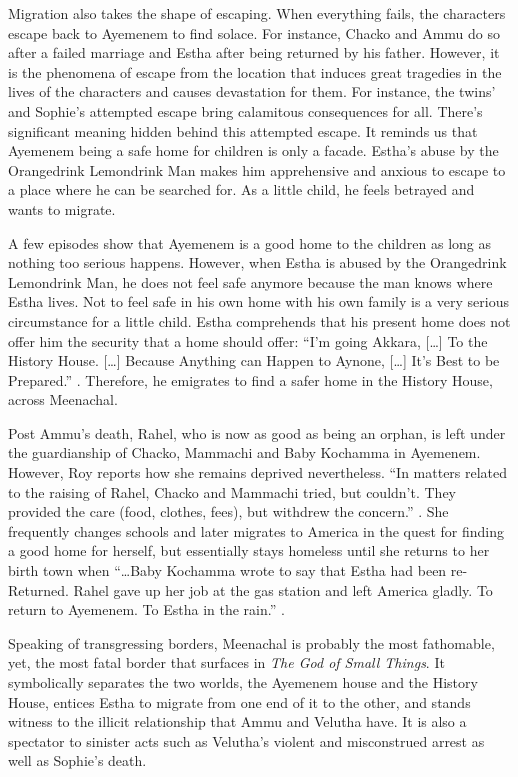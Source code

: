 Migration also takes the shape of escaping. When everything fails, the characters escape back to Ayemenem to find solace. For instance, \linebreak Chacko and Ammu do so after a failed marriage and Estha after being returned by his father. However, it is the phenomena of escape from the location that induces great tragedies in the lives of the characters and causes devastation for them. For instance, the twins' and Sophie's attempted escape bring calamitous consequences for all. There's significant meaning hidden behind this attempted escape. It reminds us that Ayemenem being a safe home for children is only a facade. Estha's abuse by the Orangedrink Lemondrink Man makes him apprehensive and anxious to escape to a place where he can be searched for. As a little child, he feels betrayed and wants to migrate.

A few episodes show that Ayemenem is a good home to the children as long as nothing too serious happens. However, when Estha is abused by the Orangedrink Lemondrink Man, he does not feel safe anymore because the man knows where Estha lives. Not to feel safe in his own home with his own family is a very serious circumstance for a little child. Estha comprehends that his present home does not offer him the security that a home should offer: ``I'm going Akkara, [\ldots] To the History House. [\ldots] Because Anything can Happen to Aynone, [\ldots] It's Best to be Prepared.'' \parencite[198]{Roy1997}. Therefore, he emigrates to find a safer home in the History House, across Meenachal. 

Post Ammu's death, Rahel, who is now as good as being an orphan, is left under the guardianship of Chacko, Mammachi and Baby Kochamma in Ayemenem. However, Roy reports how she remains deprived nevertheless. ``In matters related to the raising of Rahel, Chacko and Mammachi tried, but couldn't. They provided the care (food, clothes, fees), but withdrew the concern.'' \parencite[15]{Roy1997}. She frequently changes schools and later migrates to America in the quest for finding a good home for herself, but essentially stays homeless until she returns to her birth town when ``\ldots Baby Kochamma wrote to say that Estha had been re-Returned. Rahel gave up her job at the gas station and left America gladly. To return to Ayemenem. To Estha in the rain.'' \parencite[20]{Roy1997}. 

Speaking of transgressing borders, Meenachal is probably the most fathomable, yet, the most fatal border that surfaces in \emph{The God of Small Things}. It symbolically separates the two worlds, the Ayemenem house and the History House, entices Estha to migrate from one end of it to the other, and stands witness to the illicit relationship that Ammu and Velutha have. It is also a spectator to sinister acts such as Velutha's violent and misconstrued arrest as well as Sophie's death. 

